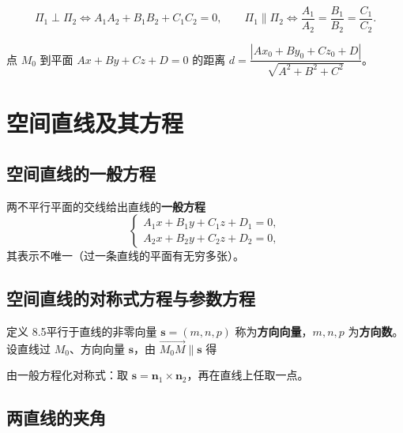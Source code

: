 
\begin{equation}
\Pi_1\perp\Pi_2\iff A_1A_2+B_1B_2+C_1C_2=0,\qquad
\Pi_1\parallel\Pi_2\iff\frac{A_1}{A_2}=\frac{B_1}{B_2}=\frac{C_1}{C_2}.
\end{equation}

点 $M_0$ 到平面 $Ax+By+Cz+D=0$ 的距离 $d=\dfrac{|Ax_0+By_0+Cz_0+D|}{\sqrt{A^2+B^2+C^2}}$。


\section{空间直线及其方程}

\subsection{空间直线的一般方程}

两不平行平面的交线给出直线的\textbf{一般方程}
\begin{equation}
\begin{cases}A_1x+B_1y+C_1z+D_1=0,\\ A_2x+B_2y+C_2z+D_2=0,\end{cases}
\end{equation}
其表示不唯一（过一条直线的平面有无穷多张）。

\subsection{空间直线的对称式方程与参数方程}

定义 8.5\quad 平行于直线的非零向量 $\boldsymbol s=(m,n,p)$ 称为\textbf{方向向量}，$m,n,p$ 为\textbf{方向数}。设直线过 $M_0$、方向向量 $\boldsymbol s$，由 $\overrightarrow{M_0M}\parallel\boldsymbol s$ 得


由一般方程化对称式：取 $\boldsymbol s=\boldsymbol n_1\times\boldsymbol n_2$，再在直线上任取一点。

\subsection{两直线的夹角}

